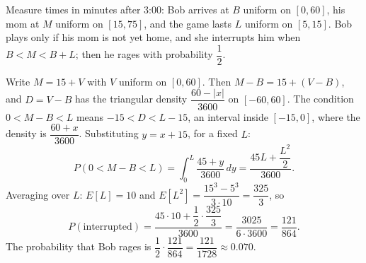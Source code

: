 Measure times in minutes after 3:00: Bob arrives at $B$ uniform on $[0,60]$, his mom at $M$ uniform on $[15,75]$, and the game lasts $L$ uniform on $[5,15]$. Bob plays only if his mom is not yet home, and she interrupts him when $B<M<B+L$; then he rages with probability $\dfrac{1}{2}$.

Write $M=15+V$ with $V$ uniform on $[0,60]$. Then $M-B=15+(V-B)$, and $D=V-B$ has the triangular density $\dfrac{60-|x|}{3600}$ on $[-60,60]$. The condition $0<M-B<L$ means $-15<D<L-15$, an interval inside $[-15,0]$, where the density is $\dfrac{60+x}{3600}$. Substituting $y=x+15$, for a fixed $L$:
\[
P(0<M-B<L)=\int_0^L\dfrac{45+y}{3600}\,dy=\dfrac{45L+\dfrac{L^2}{2}}{3600}.
\]
Averaging over $L$: $E[L]=10$ and $E[L^2]=\dfrac{15^3-5^3}{3\cdot10}=\dfrac{325}{3}$, so
\[
P(\text{interrupted})=\dfrac{45\cdot10+\dfrac{1}{2}\cdot\dfrac{325}{3}}{3600}=\dfrac{3025}{6\cdot3600}=\dfrac{121}{864}.
\]
The probability that Bob rages is $\dfrac{1}{2}\cdot\dfrac{121}{864}=\boxed{\dfrac{121}{1728}}\approx0.070$.
